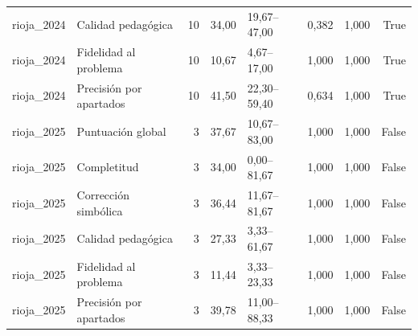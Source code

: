 \begin{tabular}{llrllllr}
rioja\_2024 & Calidad pedagógica & 10 & 34,00 & 19,67–47,00 & 0,382 & 1,000 & True \\
rioja\_2024 & Fidelidad al problema & 10 & 10,67 & 4,67–17,00 & 1,000 & 1,000 & True \\
rioja\_2024 & Precisión por apartados & 10 & 41,50 & 22,30–59,40 & 0,634 & 1,000 & True \\
rioja\_2025 & Puntuación global & 3 & 37,67 & 10,67–83,00 & 1,000 & 1,000 & False \\
rioja\_2025 & Completitud & 3 & 34,00 & 0,00–81,67 & 1,000 & 1,000 & False \\
rioja\_2025 & Corrección simbólica & 3 & 36,44 & 11,67–81,67 & 1,000 & 1,000 & False \\
rioja\_2025 & Calidad pedagógica & 3 & 27,33 & 3,33–61,67 & 1,000 & 1,000 & False \\
rioja\_2025 & Fidelidad al problema & 3 & 11,44 & 3,33–23,33 & 1,000 & 1,000 & False \\
rioja\_2025 & Precisión por apartados & 3 & 39,78 & 11,00–88,33 & 1,000 & 1,000 & False \\
\bottomrule
\end{tabular}
